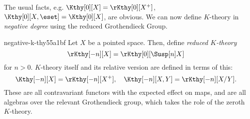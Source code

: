 The usual facts, e.g. $\Kthy[0][X] = \rKthy[0][X^+]$, $\Kthy[0][X, \eset] = \Kthy[0][X]$,
are obvious. We can now define $K$-theory in \emph{negative degree} using the reduced
Grothendieck Group.
\begin{defn}{negative-k-thy}{55a1bf}
  Let $X$ be a pointed space. Then, define \emph{reduced $K$-theory}
  \[ \rKthy[-n][X] = \rKthy[0][{\Susp[n]X}] \]
  for $n > 0$. $K$-theory itself and its relative version are defined in
  terms of this:
  \[ \Kthy[-n][X] = \rKthy[-n][X^+], \quad
       \Kthy[-n][X, Y] = \rKthy[-n][X/Y]. \]
  These are all contravariant functors with the expected effect on maps, and
  are all algebras over the relevant Grothendieck group, which takes the role of the
  zeroth $K$-theory.
\end{defn}

\makeatletter{}\makeatother

